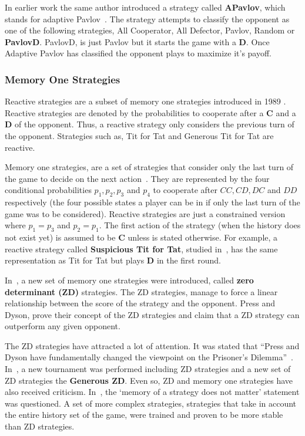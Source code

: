 \documentclass{article}
\begin{document}
In earlier work the same author introduced a strategy called \textbf{APavlov},
which stands for adaptive Pavlov~\cite{Li2007}. The strategy attempts to 
classify the opponent as one of the following strategies, All Cooperator, 
All Defector, Pavlov, Random or \textbf{PavlovD}. PavlovD, is just Pavlov
but it starts the game with a \textbf{D}. Once Adaptive Pavlov has classified
the opponent plays to maximize it's payoff.

\subsubsection{Memory One Strategies}

Reactive strategies are a subset of memory one strategies introduced in 1989
\cite{nowak1989}. Reactive strategies are denoted by the probabilities to cooperate
after a \textbf{C} and a \textbf{D} of the opponent. Thus, a reactive strategy
only considers the previous turn of the opponent. Strategies such as, Tit for
Tat and Generous Tit for Tat are reactive.

Memory one strategies, are a set of strategies that consider only the last turn
of the game to decide on the next action~\cite{Nowak1990}. They are represented
by the four conditional probabilities \(p_1, p_2, p_3\) and
\(p_4\) to cooperate after \(CC, CD, DC\) and \(DD\) respectively
(the four possible states a player can be in if only the last turn of the game was
to be considered). Reactive strategies are just a constrained version where
\(p_1=p_3\) and \(p_2=p_1\). The first action of the strategy (when the history
does not exist yet) is assumed to be \textbf{C} unless is stated otherwise. For
example, a reactive strategy called \textbf{Suspicious Tit for Tat}, studied
in~\cite{Nowak1992}, has the same representation as Tit for Tat but plays
\textbf{D} in the first round.

In~\cite{Press2012}, a new set of memory one strategies were introduced, called
\textbf{zero determinant (ZD)} strategies. The ZD strategies,
manage to force a linear relationship between the score of the strategy
and the opponent. Press and Dyson, prove their concept of the ZD strategies
and claim that a ZD strategy can outperform any given opponent.

The ZD strategies have attracted a lot of attention. It was stated that
``Press and Dyson have fundamentally changed the viewpoint on the Prisoner's
Dilemma''~\cite{Stewart2012}. In~\cite{Stewart2012}, a new tournament was
performed including ZD strategies and a new set of ZD 
strategies the \textbf{Generous ZD}. Even so, ZD and memory one strategies have
also received criticism. In~\cite{Lee2015}, the `memory of a strategy does
not matter' statement was questioned. A set of more complex strategies,
strategies that take in account the entire history set of the game, were
trained and proven to be more stable than ZD strategies.
\end{document}
